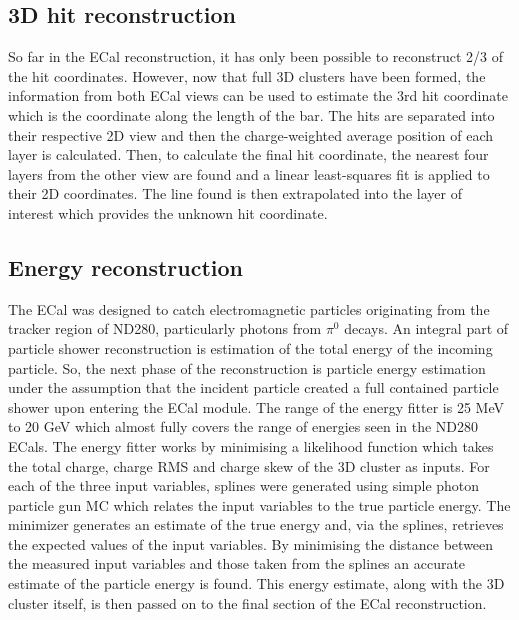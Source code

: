 \subsection{3D hit reconstruction}
\label{subsec:ECal3DHitReconstruction}
So far in the ECal reconstruction, it has only been possible to reconstruct 2/3 of the hit coordinates.  However, now that full 3D clusters have been formed, the information from both ECal views can be used to estimate the 3rd hit coordinate which is the coordinate along the length of the bar.
\newline
\newline
The hits are separated into their respective 2D view and then the charge-weighted average position of each layer is calculated.  Then, to calculate the final hit coordinate, the nearest four layers from the other view are found and a linear least-squares fit is applied to their 2D coordinates.  The line found is then extrapolated into the layer of interest which provides the unknown hit coordinate.

\subsection{Energy reconstruction}
\label{subsec:ECalEnergyReconstruction}
The ECal was designed to catch electromagnetic particles originating from the tracker region of ND280, particularly photons from $\pi^0$ decays.  An integral part of particle shower reconstruction is estimation of the total energy of the incoming particle.  So, the next phase of the reconstruction is particle energy estimation under the assumption that the incident particle created a full contained particle shower upon entering the ECal module.  The range of the energy fitter is 25 MeV to 20 GeV which almost fully covers the range of energies seen in the ND280 ECals.  The energy fitter works by minimising a likelihood function which takes the total charge, charge RMS and charge skew of the 3D cluster as inputs.  For each of the three input variables, splines were generated using simple photon particle gun MC which relates the input variables to the true particle energy.  The minimizer generates an estimate of the true energy and, via the splines, retrieves the expected values of the input variables.  By minimising the distance between the measured input variables and those taken from the splines an accurate estimate of the particle energy is found.  This energy estimate, along with the 3D cluster itself, is then passed on to the final section of the ECal reconstruction.

